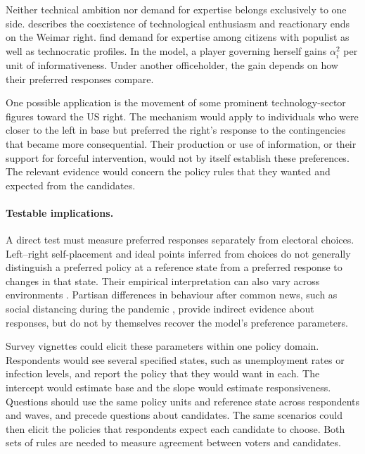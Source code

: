 \documentclass[12pt,letterpaper]{article}
\begin{document}
Neither technical ambition nor demand for expertise belongs exclusively to one side. \citet{Herf1984} describes the coexistence of technological enthusiasm and reactionary ends on the Weimar right. \citet{BertsouCaramani2022} find demand for expertise among citizens with populist as well as technocratic profiles. In the model, a player governing herself gains $\alpha_i^2$ per unit of informativeness. Under another officeholder, the gain depends on how their preferred responses compare.

One possible application is the movement of some prominent technology-sector figures toward the US right. The mechanism would apply to individuals who were closer to the left in base but preferred the right's response to the contingencies that became more consequential. Their production or use of information, or their support for forceful intervention, would not by itself establish these preferences. The relevant evidence would concern the policy rules that they wanted and expected from the candidates.

\paragraph{Testable implications.}
A direct test must measure preferred responses separately from electoral choices. Left--right self-placement and ideal points inferred from choices do not generally distinguish a preferred policy at a reference state from a preferred response to changes in that state. Their empirical interpretation can also vary across environments \citep{deVries2013,Bauer2017}. Partisan differences in behaviour after common news, such as social distancing during the pandemic \citep{Allcott2020}, provide indirect evidence about responses, but do not by themselves recover the model's preference parameters.

Survey vignettes could elicit these parameters within one policy domain. Respondents would see several specified states, such as unemployment rates or infection levels, and report the policy that they would want in each. The intercept would estimate base and the slope would estimate responsiveness. Questions should use the same policy units and reference state across respondents and waves, and precede questions about candidates. The same scenarios could then elicit the policies that respondents expect each candidate to choose. Both sets of rules are needed to measure agreement between voters and candidates.
\end{document}
